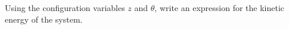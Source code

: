 Using the configuration variables $z$ and $\theta$, write an expression for the kinetic energy of the system.